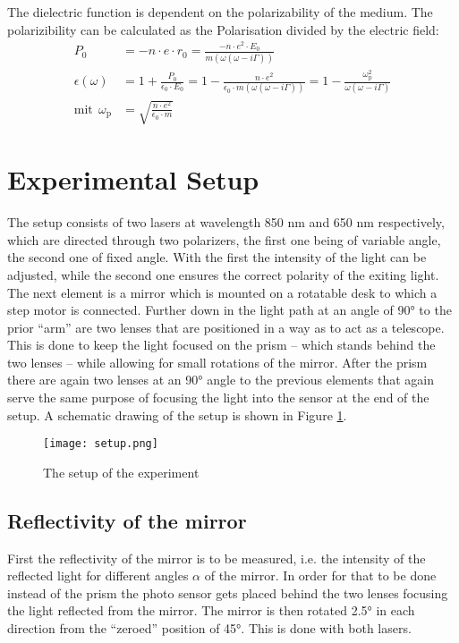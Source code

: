\documentclass[twoside,english,headsepline=on,DIV=11]{scrartcl}
\numberwithin{equation}{section}
\begin{document}
The dielectric function is dependent on the polarizability of the medium. The polarizibility can be calculated as the Polarisation divided by the electric field:
\begin{align}
P_0 &= -n \cdot e \cdot r_0 = \frac{-n \cdot e^2 \cdot E_0}{m(\omega(\omega - i \Gamma))} \label{eq:Polarisation} \\
\epsilon (\omega) &= 1 + \frac{P_0}{\epsilon_0 \cdot E_0} = 1 - \frac{n \cdot e^2}{\epsilon_0 \cdot m(\omega(\omega - i \Gamma))} = 1 - \frac{\omega_\text{p}^2}{\omega(\omega - i \Gamma)} \label{eq:DielectricFunction} \\
\text{mit} \ \ \omega_\text{p}& = \sqrt{\frac{n \cdot e^2}{\epsilon_0 \cdot m}} \label{eq:PlasmaFrequency}
\end{align}
%
\section{Experimental Setup}
The setup consists of two lasers at wavelength 850 nm and 650 nm respectively, which are directed through two polarizers, the first one being of variable angle, the second one of fixed angle. With the first the intensity of the light can be adjusted, while the second one ensures the correct polarity of the exiting light. The next element is a mirror which is mounted on a rotatable desk to which a step motor is connected. Further down in the light path at an angle of 90° to the prior ``arm'' are two lenses that are positioned in a way as to act as a telescope. This is done to keep the light focused on the prism -- which stands behind the two lenses -- while allowing for small rotations of the mirror. After the prism there are again two lenses at an 90° angle to the previous elements that again serve the same purpose of focusing the light into the sensor at the end of the setup.
A schematic drawing of the setup is shown in Figure \ref{fig:setup}.
\begin{figure}
	\centering
	\texttt{[image: setup.png]}
	\caption{The setup of the experiment\cite{anleitung}}
	\label{fig:setup}
\end{figure}

\subsection{Reflectivity of the mirror}
First the reflectivity of the mirror is to be measured, i.e. the intensity of the reflected light for different angles $\alpha$ of the mirror. In order for that to be done instead of the prism the photo sensor gets placed behind the two lenses focusing the light reflected from the mirror. The mirror is then rotated 2.5° in each direction from the ``zeroed'' position of 45°. This is done with both lasers. 
\end{document}

